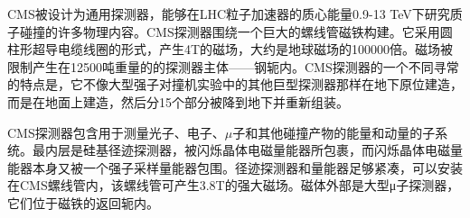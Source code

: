 CMS被设计为通用探测器，能够在LHC粒子加速器的质心能量0.9-13 TeV下研究质子碰撞的许多物理内容。CMS探测器围绕一个巨大的螺线管磁铁构建。它采用圆柱形超导电缆线圈的形式，产生4T的磁场，大约是地球磁场的100000倍。磁场被限制产生在12500吨重量的的探测器主体——钢轭内。CMS探测器的一个不同寻常的特点是，它不像大型强子对撞机实验中的其他巨型探测器那样在地下原位建造，而是在地面上建造，然后分15个部分被降到地下并重新组装。

CMS探测器包含用于测量光子、电子、$\mu$子和其他碰撞产物的能量和动量的子系统。最内层是硅基径迹探测器，被闪烁晶体电磁量能器所包裹，而闪烁晶体电磁量能器本身又被一个强子采样量能器包围。径迹探测器和量能器足够紧凑，可以安装在CMS螺线管内，该螺线管可产生3.8T的强大磁场。磁体外部是大型μ子探测器，它们位于磁铁的返回轭内。